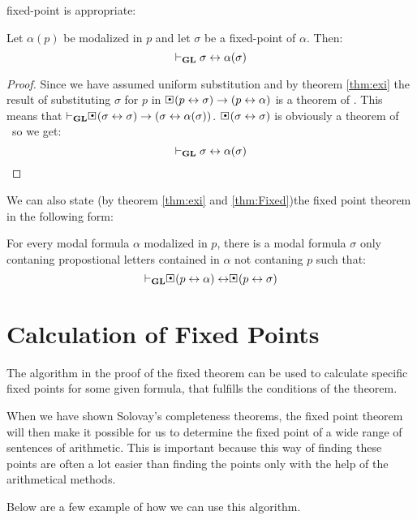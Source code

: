 \documentclass[../main.tex]{subfiles}
\begin{document}
fixed-point is appropriate:
\begin{cor}
	Let $\alpha(p)$ be modalized in $p$ and let $\sigma$ be a fixed-point
	of $\alpha$. Then:
	\[\vdash_{\text{\textbf{GL}}}\sigma\leftrightarrow\alpha(\sigma)\]
\end{cor}
\begin{proof}
	Since we have assumed uniform substitution and by theorem \ref{thm:exi}
	the result of substituting $\sigma$ for $p$ in
	$\sBox(p\leftrightarrow\sigma)\rightarrow(p\leftrightarrow\alpha)$ is a
	theorem of \GL. This means that
	$\vdash_\GL\sBox(\sigma\leftrightarrow\sigma)\rightarrow(\sigma\leftrightarrow\alpha(\sigma))$.
	$\sBox(\sigma\leftrightarrow\sigma)$ is obviously a theorem of \GL\ so
	we get:
	\[\vdash_{\text{\textbf{GL}}}\sigma\leftrightarrow\alpha(\sigma)\]
\end{proof}
We can also state  (by theorem \ref{thm:exi} and \ref{thm:Fixed})the fixed
point theorem in the following form:

\begin{cor}
	\label{cor:Fixed}
	For every modal formula $\alpha$ modalized in $p$, there is a modal formula
	$\sigma$ only contaning propostional letters contained in $\alpha$ not
	contaning $p$ such that:
	\[\vdash_\GL\sBox(p\leftrightarrow\alpha)\leftrightarrow\sBox(p\leftrightarrow\sigma)\]
\end{cor}
\section{Calculation of Fixed Points}

The algorithm in the proof of the fixed theorem can be used to calculate
specific fixed points for some given formula, that fulfills the conditions of
the theorem. 

When we have shown Solovay's completeness theorems, the fixed point theorem
will then make it possible for us to determine the fixed point of a wide range
of sentences of arithmetic. This is important because this way of finding these
points are often a lot easier than finding the points only with the help of the
arithmetical methods.

Below are a few example of how we can use this algorithm.
\end{document}
